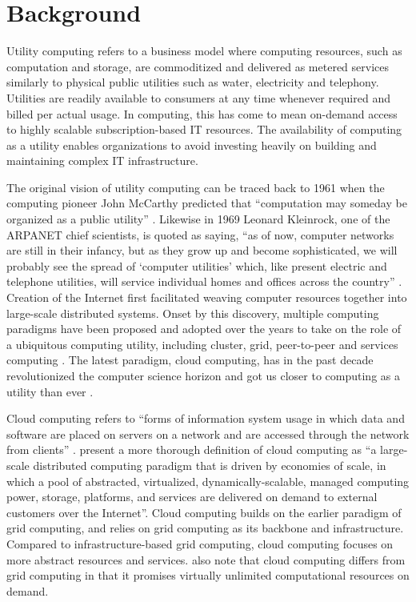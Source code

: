 \section{Background} \label{sec:background}

Utility computing refers to a business model where computing resources, such as computation and storage, are commoditized and delivered as metered services similarly to physical public utilities such as water, electricity and telephony. Utilities are readily available to consumers at any time whenever required and billed per actual usage. In computing, this has come to mean on-demand access to highly scalable subscription-based IT resources. The availability of computing as a utility enables organizations to avoid investing heavily on building and maintaining complex IT infrastructure. \parencite{buyya09cloud}

The original vision of utility computing can be traced back to 1961 when the computing pioneer John McCarthy predicted that ``computation may someday be organized as a public utility'' \parencite{foster08cloudGrid}. Likewise in 1969 Leonard Kleinrock, one of the ARPANET chief scientists, is quoted as saying, ``as of now, computer networks are still in their infancy, but as they grow up and become sophisticated, we will probably see the spread of ‘computer utilities’ which, like present electric and telephone utilities, will service individual homes and offices across the country'' \parencite{kleinrock03internet}. Creation of the Internet first facilitated weaving computer resources together into large-scale distributed systems. Onset by this discovery, multiple computing paradigms have been proposed and adopted over the years to take on the role of a ubiquitous computing utility, including cluster, grid, peer-to-peer and services computing \parencite{buyya09cloud}. The latest paradigm, cloud computing, has in the past decade revolutionized the computer science horizon and got us closer to computing as a utility than ever \parencite{buyya2017manifesto}.

Cloud computing refers to ``forms of information system usage in which data and software are placed on servers on a network and are accessed through the network from clients'' \parencite{tsuruoka16}.
\textcite{foster08cloudGrid} present a more thorough definition of cloud computing as ``a large-scale distributed computing paradigm that is driven by economies of scale, in which a pool of abstracted, virtualized, dynamically-scalable, managed computing power, storage, platforms, and services are delivered on demand to external customers over the Internet''. Cloud computing builds on the earlier paradigm of grid computing, and relies on grid computing as its backbone and infrastructure. Compared to infrastructure-based grid computing, cloud computing focuses on more abstract resources and services. \textcite{buyya2017manifesto} also note that cloud computing differs from grid computing in that it promises virtually unlimited computational resources on demand.

